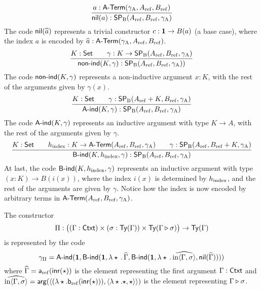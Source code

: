 \documentclass{schwicht}
\begin{document}
\[
\infer{\nilB(a) : \SPB(\Aref, \Bref, \gammaA)}{a : \Aterm(\gammaA, \Aref, \Bref)}
\]
%
The code $\mathsf{nil}(\widehat{a})$ represents a trivial constructor $c :
\mathbf{1} \to B(a)$ (a base case), where the index $a$ is encoded by
$\widehat{a} : \mathsf{A}\text{-}\mathsf{Term}(\gamma_{\mathrm{A}}, A_{\mathrm{ref}}, B_{\mathrm{ref}})$.
%
\[
\infer{\nonindB(K, \gamma) : \SPB(\Aref, \Bref, \gammaA))}{K : \Set & \quad \gamma : K \to \SPB(\Aref, \Bref, \gammaA)}
\]
%
The code $\mathsf{non}\text{-}\mathsf{ind}(K, \gamma)$ represents a non-inductive argument $x: K$, with the rest of the arguments given by $\gamma(x)$.
%
\[
\infer{\AindB(K, \gamma) : \SPB(\Aref, \Bref, \gammaA)}{K : \Set & \quad \gamma : \SPB(\Aref + K, \Bref, \gammaA)}
\]
%
The code $\mathsf{A}\text{-}\mathsf{ind}(K, \gamma)$ represents an inductive argument with
type $K \to A$, with the rest of the arguments given by
$\gamma$.
%
\[
\resizebox{\textwidth}{!}{
\infer{\BindB(K, \hindex, \gamma) : \SPB(\Aref, \Bref, \gammaA)}{K : \Set & \quad \hindex : K \to \Aterm(\Aref, \Bref, \gammaA) & \quad \gamma : \SPB(\Aref, \Bref + K, \gammaA)}
}
\]
%
At last, the code $\mathsf{B}\text{-}\mathsf{ind}(K, h_{\mathrm{index}}, \gamma)$ represents an inductive
argument with type $(x : K) \to B(i(x))$, where the index $i(x)$ is
determined by $h_{\mathrm{index}}$, and the rest of the arguments are given by
$\gamma$. Notice how the index is now encoded by arbitrary terms in
$\mathsf{A}\text{-}\mathsf{Term}(A_{\mathrm{ref}}, B_{\mathrm{ref}}, \gamma_{\mathrm{A}})$.
%
\begin{example}
  The constructor
  \[
  \Pi : \big((\Gamma : \mathsf{Ctxt}) \times (\sigma : \mathsf{Ty}(\Gamma)) \times \mathsf{Ty}(\Gamma \triangleright \sigma)\big)\to \mathsf{Ty}(\Gamma)
  \]
  is represented by the code
  \[
  \gamma_{\Pi} = \mathsf{A}\text{-}\mathsf{ind}(\mathbf{1},
                  \mathsf{B}\text{-}\mathsf{ind}(\mathbf{1}, \lambda \star\,.\,\widehat{\Gamma}, 
                    \mathsf{B}\text{-}\mathsf{ind}(\mathbf{1}, \lambda \star\,.\,\widehat{\text{in}\langle \Gamma , \sigma\rangle},
                      \mathsf{nil}(\widehat{\Gamma}))))
  \]
  where $\widehat{\Gamma} = \mathsf{a}_{\mathrm{ref}}(\mathsf{inr}(\star))$ is the element
  representing the first argument $\Gamma : \mathsf{Ctxt}$ and
  $\widehat{\text{in}\langle \Gamma , \sigma\rangle} = \mathsf{arg}(\langle
  (\lambda \star.\mathsf{b}_{\mathrm{ref}}(\mathsf{inr}(\star))), \langle \lambda
  \star.\star, \star\rangle\rangle)$ is the element representing
  $\Gamma \triangleright \sigma$. 

\hfill \blackqed
\end{example}
\end{document}
